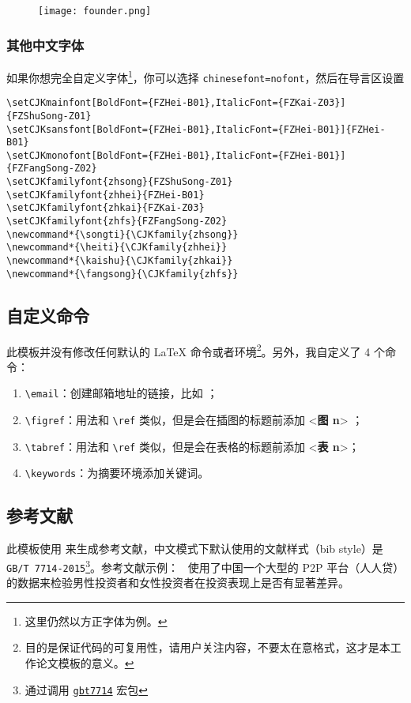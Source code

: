 \documentclass[lang=cn,11pt,a4paper,cite=authoryear]{elegantpaper}
\begin{document}
\begin{figure}[!htb]
\centering
\texttt{[image: founder.png]}
\end{figure}

\subsubsection{其他中文字体}
如果你想完全自定义字体\footnote{这里仍然以方正字体为例。}，你可以选择 \lstinline{chinesefont=nofont}，然后在导言区设置
\begin{lstlisting}
\setCJKmainfont[BoldFont={FZHei-B01},ItalicFont={FZKai-Z03}]{FZShuSong-Z01}
\setCJKsansfont[BoldFont={FZHei-B01},ItalicFont={FZHei-B01}]{FZHei-B01}
\setCJKmonofont[BoldFont={FZHei-B01},ItalicFont={FZHei-B01}]{FZFangSong-Z02}
\setCJKfamilyfont{zhsong}{FZShuSong-Z01}
\setCJKfamilyfont{zhhei}{FZHei-B01}
\setCJKfamilyfont{zhkai}{FZKai-Z03}
\setCJKfamilyfont{zhfs}{FZFangSong-Z02}
\newcommand*{\songti}{\CJKfamily{zhsong}}
\newcommand*{\heiti}{\CJKfamily{zhhei}}
\newcommand*{\kaishu}{\CJKfamily{zhkai}}
\newcommand*{\fangsong}{\CJKfamily{zhfs}}
\end{lstlisting}


\subsection{自定义命令}
此模板并没有修改任何默认的 \LaTeX{} 命令或者环境\footnote{目的是保证代码的可复用性，请用户关注内容，不要太在意格式，这才是本工作论文模板的意义。}。另外，我自定义了 4 个命令：
\begin{enumerate}
  \item \lstinline{\email}：创建邮箱地址的链接，比如 ；
  \item \lstinline{\figref}：用法和 \lstinline{\ref} 类似，但是会在插图的标题前添加 <\textbf{图 n}> ；
  \item \lstinline{\tabref}：用法和 \lstinline{\ref} 类似，但是会在表格的标题前添加 <\textbf{表 n}>；
  \item \lstinline{\keywords}：为摘要环境添加关键词。
\end{enumerate}

\subsection{参考文献}
此模板使用  来生成参考文献，中文模式下默认使用的文献样式（bib style）是 \lstinline{GB/T 7714-2015}\footnote{通过调用 \href{https://ctan.org/pkg/gbt7714}{\lstinline{gbt7714}} 宏包}。参考文献示例：~\cite{en3} 使用了中国一个大型的 P2P 平台（人人贷）的数据来检验男性投资者和女性投资者在投资表现上是否有显著差异。
\end{document}
